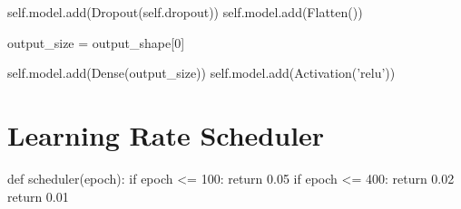 \begin{appendices}
\begin{python}
        self.model.add(Dropout(self.dropout))
        self.model.add(Flatten())
        
        output_size = output_shape[0]

        self.model.add(Dense(output_size))
        self.model.add(Activation('relu'))
\end{python}

\section{Learning Rate Scheduler}
\begin{python}
def scheduler(epoch):
    if epoch <= 100:
        return 0.05
    if epoch <= 400:
        return 0.02
    return 0.01
\end{python}
    
\end{appendices}